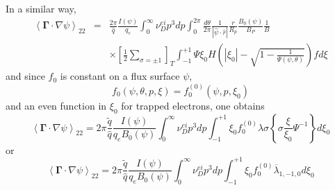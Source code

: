 In a similar way,
\begin{eqnarray}
\left\langle \mathbf{\Gamma }\cdot \nabla \psi \right\rangle _{22} &=&\frac{
2\pi }{\widehat{q}}\frac{I\left( \psi \right) }{q_{e}}\int_{0}^{\infty }\nu
_{D}^{ei}p^{3}dp\int_{0}^{2\pi }\frac{d\theta }{2\pi }\frac{1}{\left|
\widehat{\psi }\cdot \widehat{r}\right| }\frac{r}{R_{p}}\frac{B_{0}\left(
\psi \right) }{B_{P}}\frac{1}{B}  \nonumber \\
&&\times \left[ \frac{1}{2}\sum_{\sigma =\pm 1}\right]
_{T}\int_{-1}^{+1}\Psi \xi _{0}H\left( \left| \xi _{0}\right| -\sqrt{1-\frac{
1}{\Psi \left( \psi ,\theta \right) }}\right) fd\xi
\end{eqnarray}
and since $f_{0}$ is constant on a flux surface $\psi $,
\begin{equation}
f_{0}\left( \psi ,\theta ,p,\xi \right) =f_{0}^{\left( 0\right) }\left( \psi
,p,\xi _{0}\right)
\end{equation}
and an even function in $\xi _{0}$ for trapped electrons, one obtains
\begin{equation}
\left\langle \mathbf{\Gamma }\cdot \nabla \psi \right\rangle _{22}=2\pi
\frac{\widetilde{q}}{\widehat{q}}\frac{I\left( \psi \right) }{
q_{e}B_{0}\left( \psi \right) }\int_{0}^{\infty }\nu
_{D}^{ei}p^{3}dp\int_{-1}^{+1}\xi _{0}f_{0}^{\left( 0\right) }\lambda \sigma
\left\{ \sigma \frac{\xi }{\xi _{0}}\Psi ^{-1}\right\} d\xi _{0}
\end{equation}
or
\begin{equation}
\left\langle \mathbf{\Gamma }\cdot \nabla \psi \right\rangle _{22}=2\pi
\frac{\widetilde{q}}{\widehat{q}}\frac{I\left( \psi \right) }{
q_{e}B_{0}\left( \psi \right) }\int_{0}^{\infty }\nu
_{D}^{ei}p^{3}dp\int_{-1}^{+1}\xi _{0}f_{0}^{\left( 0\right) }\overline{
\lambda }_{1,-1,0}d\xi _{0}
\end{equation}

